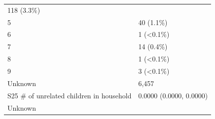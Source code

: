 \documentclass[]{article}
\begin{document}
\begin{longtable}[]{@{}ll@{}}
\begin{minipage}[t]{0.23\columnwidth}
118 (3.3\%)\strut
\end{minipage}\tabularnewline
\begin{minipage}[t]{0.71\columnwidth}\raggedright
5\strut
\end{minipage} & \begin{minipage}[t]{0.23\columnwidth}\raggedright
40 (1.1\%)\strut
\end{minipage}\tabularnewline
\begin{minipage}[t]{0.71\columnwidth}\raggedright
6\strut
\end{minipage} & \begin{minipage}[t]{0.23\columnwidth}\raggedright
1 (\textless0.1\%)\strut
\end{minipage}\tabularnewline
\begin{minipage}[t]{0.71\columnwidth}\raggedright
7\strut
\end{minipage} & \begin{minipage}[t]{0.23\columnwidth}\raggedright
14 (0.4\%)\strut
\end{minipage}\tabularnewline
\begin{minipage}[t]{0.71\columnwidth}\raggedright
8\strut
\end{minipage} & \begin{minipage}[t]{0.23\columnwidth}\raggedright
1 (\textless0.1\%)\strut
\end{minipage}\tabularnewline
\begin{minipage}[t]{0.71\columnwidth}\raggedright
9\strut
\end{minipage} & \begin{minipage}[t]{0.23\columnwidth}\raggedright
3 (\textless0.1\%)\strut
\end{minipage}\tabularnewline
\begin{minipage}[t]{0.71\columnwidth}\raggedright
Unknown\strut
\end{minipage} & \begin{minipage}[t]{0.23\columnwidth}\raggedright
6,457\strut
\end{minipage}\tabularnewline
\begin{minipage}[t]{0.71\columnwidth}\raggedright
S25 \# of unrelated children in household\strut
\end{minipage} & \begin{minipage}[t]{0.23\columnwidth}\raggedright
0.0000 (0.0000, 0.0000)\strut
\end{minipage}\tabularnewline
\begin{minipage}[t]{0.71\columnwidth}\raggedright
Unknown\strut
\end{minipage} & \begin{minipage}[t]{0.23\columnwidth}\raggedright

\end{minipage}
\end{longtable}
\end{document}
